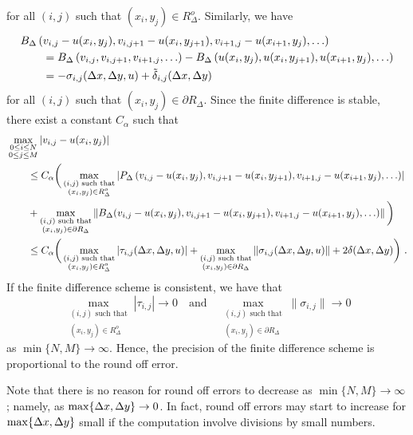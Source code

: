 for all $(i,j)$ such that $(x_i,y_j) \in R^o_\Delta$.
Similarly, we have
\begin{align*}
&B_\Delta\left(v_{i,j}-u(x_i,y_j), v_{i,j+1}-u(x_i,y_{j+1}),
v_{i+1,j}-u(x_{i+1},y_j), \ldots\right) \\
&\qquad = B_\Delta\left(v_{i,j}, v_{i,j+1}, v_{i+1,j}, \ldots\right) - 
B_\Delta\left(u(x_i,y_j), u(x_i,y_{j+1}), u(x_{i+1},y_j), \ldots \right)  \\
&\qquad
= -\sigma_{i,j}(\Delta{x},\Delta{y},u) + \tilde{\delta}_{i,j}(\Delta{x},\Delta{y})
\end{align*}
for all $(i,j)$ such that $(x_i,y_j) \in \partial R_\Delta$.  Since
the finite difference is stable, there exist a constant $C_\alpha$ such that
\begin{align*}
&\max_{\substack{0\leq i\leq N\\0\leq j \leq M}} |v_{i,j} - u(x_i,y_j)| \\
&\qquad \leq C_\alpha \bigg(
\max_{\substack{(i,j) \text{ such that}\\(x_i,y_j)\in R^o_\Delta}}
\left| P_\Delta\left(v_{i,j}-u(x_i,y_j), v_{i,j+1}-u(x_i,y_{j+1}),
v_{i+1,j}- u(x_{i+1},y_j),\ldots\right) \right| \\
&\qquad
+ \max_{\substack{(i,j) \text{ such that}\\ (x_i,y_j)\in \partial R_\Delta}}
\left\| B_\Delta(v_{i,j}-u(x_i,y_j),v_{i,j+1}-u(x_i,y_{j+1}),v_{i+1,j}
  -u(x_{i+1},y_j), \ldots) \right\| \bigg) \\
& \qquad \leq C_\alpha \bigg(  
\max_{\substack{(i,j) \text{ such that}\\(x_i,y_j) \in R^o_\Delta}}
|\tau_{i,j}(\dtx{x},\dtx{y},u)|
+\max_{\substack{(i,j) \text{ such that}\\(x_i,y_j) \in \partial R_\Delta}}
\|\sigma_{i,j}(\dtx{x},\dtx{y},u)\| + 2 \delta(\dtx{x},\dtx{y}) \bigg) \ .
\end{align*}
If the finite difference scheme is consistent, we have that
\[
\max_{\substack{(i,j) \text{ such that}\\(x_i,y_j) \in R^o_\Delta}}
|\tau_{i,j}| \to 0 \quad \text{and} \quad
\max_{\substack{(i,j) \text{ such that}\\(x_i,y_j) \in \partial R_\Delta}}
\|\sigma_{i,j}\| \to 0
\]
as $\min \{N, M\} \rightarrow \infty$.  Hence, the precision of the
finite difference scheme is proportional to the round off error.

Note that there is no reason for round off errors to decrease as
$\min \{N, M\} \rightarrow \infty$; namely, as
$\max\{\Delta{x},\Delta{y}\} \to 0$.   In fact, round off errors may
start to increase for $\max\{\Delta{x},\Delta{y}\}$ small if the
computation involve divisions by small numbers.

